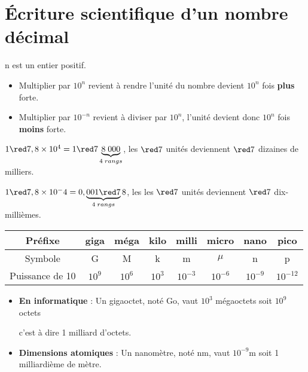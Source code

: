 \section{Écriture scientifique d'un nombre décimal}\subitem{}\par

\begin{propriete}
    n est un entier positif.
    \begin{itemize}
        \item Multiplier par $10^n$ revient à rendre l'unité du nombre devient $10^n$ fois \textbf{plus} forte.
        \item Multiplier par $10^{-n}$ revient à diviser par $10^n$, l'unité devient donc $10^n$ fois \textbf{moins} forte.
    \end{itemize}
\end{propriete}

\begin{exemple*1}   
    $1{\red 7},8 \times 10^4 = 1{\red 7}\underbrace{8\;000}_{4\;rangs}$, les ${\red 7}$ unités deviennent ${\red 7}$ dizaines de milliers. 

    $1{\red 7},8 \times 10^-4 = 0,\underbrace{001{\red 7}}_{4\;rangs}8$, les les ${\red 7}$ unités deviennent ${\red 7}$ dix-millièmes. 
\end{exemple*1}

\begin{definition}
    \begin{center}
        {\renewcommand{\arraystretch}{1}
        \begin{tabular}{||c||c||c||c||c||c||c||c||}
        \hline 
        \rule[-1ex]{0pt}{2.5ex} Préfixe & giga & méga & kilo & milli & micro & nano & pico \\ 
        \hline 
        \rule[-1ex]{0pt}{2.5ex} Symbole & G & M & k & m & $\mu$ & n & p \\ 
        \hline 
        \rule[-1ex]{0pt}{2.5ex} Puissance de 10 & $10^{9}$ & $10^{6}$ & $10^{3}$ & $10^{-3}$ & $10^{-6}$ & $10^{-9}$ & $10^{-12}$ \\ 
        \hline 
        \end{tabular} 
        }
    \end{center}
\end{definition}

\begin{exemple*1}
    \begin{itemize}
        \item \textbf{En informatique} : Un gigaoctet, noté Go, vaut $10^{3}$ mégaoctets soit $10^{9}$ octets 
        
        c'est à dire 1 milliard d'octets.
        \item \textbf{Dimensions atomiques} : Un nanomètre, noté nm, vaut $10^{-9}$m soit 1 milliardième de mètre.
    \end{itemize}
\end{exemple*1}

